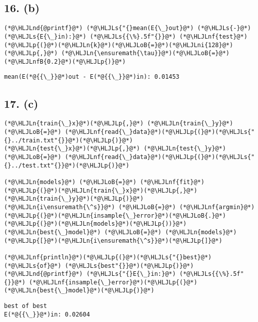 \documentclass[12pt,a4paper]{article}
\newcommand{\HLJLn}[1]{#1}
\newcommand{\HLJLnd}[1]{\textcolor[RGB]{214,102,97}{#1}}
\newcommand{\HLJLnf}[1]{\textcolor[RGB]{66,102,213}{#1}}
\newcommand{\HLJLs}[1]{\textcolor[RGB]{201,61,57}{#1}}
\newcommand{\HLJLnfB}[1]{\textcolor[RGB]{59,151,46}{#1}}
\newcommand{\HLJLni}[1]{\textcolor[RGB]{59,151,46}{#1}}
\newcommand{\HLJLoB}[1]{\textcolor[RGB]{102,102,102}{\textbf{#1}}}
\newcommand{\HLJLp}[1]{#1}
\begin{document}
\subsection{16. (b)}

\begin{lstlisting}
(*@\HLJLnd{@printf}@*) (*@\HLJLs{"{}mean(E{\_}out}@*) (*@\HLJLs{-}@*) (*@\HLJLs{E{\_}in):}@*) (*@\HLJLs{{\%}.5f"{}}@*) (*@\HLJLnf{test}@*)(*@\HLJLp{(}@*)(*@\HLJLn{k}@*)(*@\HLJLoB{=}@*)(*@\HLJLni{128}@*)(*@\HLJLp{,}@*) (*@\HLJLn{\ensuremath{\tau}}@*)(*@\HLJLoB{=}@*)(*@\HLJLnfB{0.2}@*)(*@\HLJLp{)}@*)
\end{lstlisting}

\begin{lstlisting}
mean(E(*@{{\_}}@*)out - E(*@{{\_}}@*)in): 0.01453
\end{lstlisting}


\subsection{17. (c)}

\begin{lstlisting}
(*@\HLJLn{train{\_}x}@*)(*@\HLJLp{,}@*) (*@\HLJLn{train{\_}y}@*) (*@\HLJLoB{=}@*) (*@\HLJLnf{read{\_}data}@*)(*@\HLJLp{(}@*)(*@\HLJLs{"{}../train.txt"{}}@*)(*@\HLJLp{)}@*)
(*@\HLJLn{test{\_}x}@*)(*@\HLJLp{,}@*) (*@\HLJLn{test{\_}y}@*) (*@\HLJLoB{=}@*) (*@\HLJLnf{read{\_}data}@*)(*@\HLJLp{(}@*)(*@\HLJLs{"{}../test.txt"{}}@*)(*@\HLJLp{)}@*)

(*@\HLJLn{models}@*) (*@\HLJLoB{=}@*) (*@\HLJLnf{fit}@*)(*@\HLJLp{(}@*)(*@\HLJLn{train{\_}x}@*)(*@\HLJLp{,}@*) (*@\HLJLn{train{\_}y}@*)(*@\HLJLp{)}@*)
(*@\HLJLn{i\ensuremath{\^s}}@*) (*@\HLJLoB{=}@*) (*@\HLJLnf{argmin}@*)(*@\HLJLp{(}@*)(*@\HLJLn{insample{\_}error}@*)(*@\HLJLoB{.}@*)(*@\HLJLp{(}@*)(*@\HLJLn{models}@*)(*@\HLJLp{))}@*)
(*@\HLJLn{best{\_}model}@*) (*@\HLJLoB{=}@*) (*@\HLJLn{models}@*)(*@\HLJLp{[}@*)(*@\HLJLn{i\ensuremath{\^s}}@*)(*@\HLJLp{]}@*)

(*@\HLJLnf{println}@*)(*@\HLJLp{(}@*)(*@\HLJLs{"{}best}@*) (*@\HLJLs{of}@*) (*@\HLJLs{best"{}}@*)(*@\HLJLp{)}@*)
(*@\HLJLnd{@printf}@*) (*@\HLJLs{"{}E{\_}in:}@*) (*@\HLJLs{{\%}.5f"{}}@*) (*@\HLJLnf{insample{\_}error}@*)(*@\HLJLp{(}@*)(*@\HLJLn{best{\_}model}@*)(*@\HLJLp{)}@*)
\end{lstlisting}

\begin{lstlisting}
best of best
E(*@{{\_}}@*)in: 0.02604
\end{lstlisting}
\end{document}
